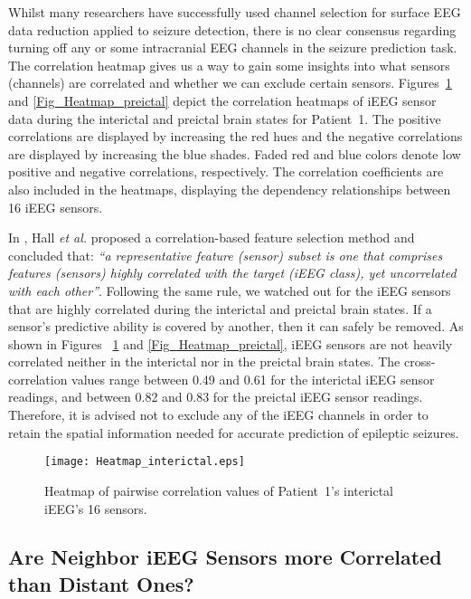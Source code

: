 \documentclass[journal]{IEEEtran}
\begin{document}
Whilst many researchers have successfully used channel selection for surface EEG data reduction applied to seizure detection, there is no clear consensus regarding turning off any or some intracranial EEG channels in the seizure prediction task. The correlation heatmap gives us a way to gain some insights into what sensors (channels) are correlated and whether we can exclude certain sensors. Figures~\ref{Fig_Heatmap_interictal} and \ref{Fig_Heatmap_preictal} depict the correlation heatmaps of iEEG sensor data during the interictal and preictal brain states for Patient~1. The positive correlations are displayed by increasing the red hues and the negative correlations are displayed by increasing the blue shades. Faded red and blue colors denote low positive and negative correlations, respectively. The correlation coefficients are also included in the heatmaps, displaying the dependency relationships between 16 iEEG sensors.



In \cite{hall1999correlation}, Hall \textit{et al.} proposed a correlation-based feature selection method and concluded that: \textit{``a representative feature (sensor) subset is one that comprises features (sensors) highly correlated with the target (iEEG class), yet uncorrelated with each other''}. Following the same rule, we watched out for the iEEG sensors that are highly correlated during the interictal and preictal brain states. If a sensor’s predictive ability is covered by another, then it can safely be removed. As shown in Figures ~\ref{Fig_Heatmap_interictal} and \ref{Fig_Heatmap_preictal}, iEEG sensors are not heavily correlated neither in the interictal nor in the preictal brain states. The cross-correlation values range between 0.49 and 0.61 for the interictal iEEG sensor readings, and between 0.82 and 0.83 for the preictal iEEG sensor readings. Therefore, it is advised not to exclude any of the iEEG channels in order to retain the spatial information needed for accurate prediction of epileptic seizures.



\begin{figure}[!t]\centering
	\texttt{[image: Heatmap\_interictal.eps]}
	\caption{Heatmap of pairwise correlation values of Patient~1’s interictal iEEG's 16 sensors.}
\label{Fig_Heatmap_interictal}
\end{figure}


\subsection{Are Neighbor iEEG Sensors more Correlated than Distant Ones?}
\end{document}
